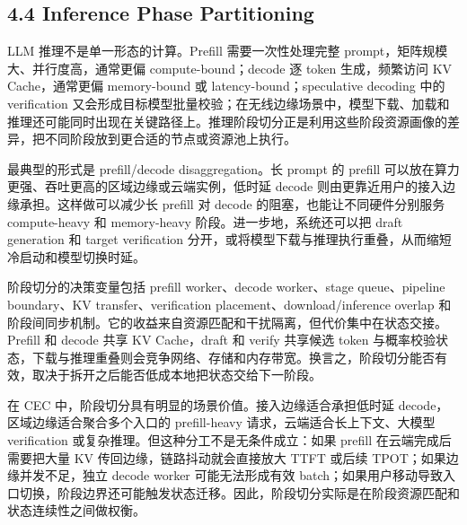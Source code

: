 \documentclass[a4paper,twocolumn,10pt]{ctexart}
\begin{document}
\subsection{4.4 Inference Phase Partitioning}

LLM 推理不是单一形态的计算。Prefill 需要一次性处理完整 prompt，矩阵规模大、并行度高，通常更偏 compute-bound；decode 逐 token 生成，频繁访问 KV Cache，通常更偏 memory-bound 或 latency-bound；speculative decoding 中的 verification 又会形成目标模型批量校验；在无线边缘场景中，模型下载、加载和推理还可能同时出现在关键路径上。推理阶段切分正是利用这些阶段资源画像的差异，把不同阶段放到更合适的节点或资源池上执行。


最典型的形式是 prefill/decode disaggregation。长 prompt 的 prefill 可以放在算力更强、吞吐更高的区域边缘或云端实例，低时延 decode 则由更靠近用户的接入边缘承担。这样做可以减少长 prefill 对 decode 的阻塞，也能让不同硬件分别服务 compute-heavy 和 memory-heavy 阶段。进一步地，系统还可以把 draft generation 和 target verification 分开，或将模型下载与推理执行重叠，从而缩短冷启动和模型切换时延。


阶段切分的决策变量包括 prefill worker、decode worker、stage queue、pipeline boundary、KV transfer、verification placement、download/inference overlap 和阶段间同步机制。它的收益来自资源匹配和干扰隔离，但代价集中在状态交接。Prefill 和 decode 共享 KV Cache，draft 和 verify 共享候选 token 与概率校验状态，下载与推理重叠则会竞争网络、存储和内存带宽。换言之，阶段切分能否有效，取决于拆开之后能否低成本地把状态交给下一阶段。


在 CEC 中，阶段切分具有明显的场景价值。接入边缘适合承担低时延 decode，区域边缘适合聚合多个入口的 prefill-heavy 请求，云端适合长上下文、大模型 verification 或复杂推理。但这种分工不是无条件成立：如果 prefill 在云端完成后需要把大量 KV 传回边缘，链路抖动就会直接放大 TTFT 或后续 TPOT；如果边缘并发不足，独立 decode worker 可能无法形成有效 batch；如果用户移动导致入口切换，阶段边界还可能触发状态迁移。因此，阶段切分实际是在阶段资源匹配和状态连续性之间做权衡。
\end{document}
